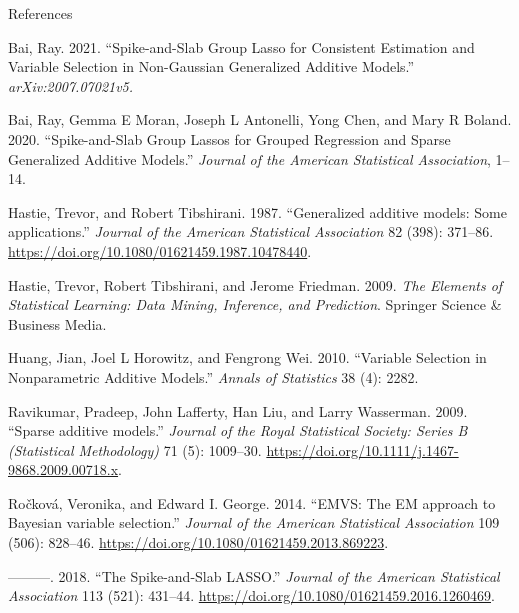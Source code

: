 \documentclass[
  ignorenonframetext,
  aspectratio=169]{beamer}
\newlength{\cslhangindent}
\newlength{\cslentryspacingunit} %
\newenvironment{CSLReferences}[2] %
 {%
  \setlength{\parindent}{0pt}
  \ifodd #1
  \let\oldpar\par
  \def\par{\hangindent=\cslhangindent\oldpar}
  \fi
  \setlength{\parskip}{#2\cslentryspacingunit}
 }%
 {}
\begin{document}
\begin{frame}[allowframebreaks]{References}
\hypertarget{refs}{}
\begin{CSLReferences}{1}{0}
\leavevmode{}%
Bai, Ray. 2021. {``Spike-and-Slab Group Lasso for Consistent Estimation
and Variable Selection in Non-Gaussian Generalized Additive Models.''}
\emph{arXiv:2007.07021v5.}

\leavevmode{}%
Bai, Ray, Gemma E Moran, Joseph L Antonelli, Yong Chen, and Mary R
Boland. 2020. {``Spike-and-Slab Group Lassos for Grouped Regression and
Sparse Generalized Additive Models.''} \emph{Journal of the American
Statistical Association}, 1--14.

\leavevmode{}%
Hastie, Trevor, and Robert Tibshirani. 1987. {``{Generalized additive
models: Some applications}.''} \emph{Journal of the American Statistical
Association} 82 (398): 371--86.
\url{https://doi.org/10.1080/01621459.1987.10478440}.

\leavevmode{}%
Hastie, Trevor, Robert Tibshirani, and Jerome Friedman. 2009. \emph{The
Elements of Statistical Learning: Data Mining, Inference, and
Prediction}. Springer Science \& Business Media.

\leavevmode{}%
Huang, Jian, Joel L Horowitz, and Fengrong Wei. 2010. {``Variable
Selection in Nonparametric Additive Models.''} \emph{Annals of
Statistics} 38 (4): 2282.

\leavevmode{}%
Ravikumar, Pradeep, John Lafferty, Han Liu, and Larry Wasserman. 2009.
{``{Sparse additive models}.''} \emph{Journal of the Royal Statistical
Society: Series B (Statistical Methodology)} 71 (5): 1009--30.
\url{https://doi.org/10.1111/j.1467-9868.2009.00718.x}.

\leavevmode{}%
Ročková, Veronika, and Edward I. George. 2014. {``{EMVS: The EM approach
to Bayesian variable selection}.''} \emph{Journal of the American
Statistical Association} 109 (506): 828--46.
\url{https://doi.org/10.1080/01621459.2013.869223}.

\leavevmode{}%
---------. 2018. {``{The Spike-and-Slab LASSO}.''} \emph{Journal of the
American Statistical Association} 113 (521): 431--44.
\url{https://doi.org/10.1080/01621459.2016.1260469}.


\end{CSLReferences}
\end{frame}
\end{document}
